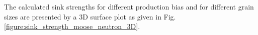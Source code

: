 \documentclass[a4paper]{article}
\begin{document}
      \newpage
      The calculated sink strengths for different production bias and for different grain sizes are presented by a 3D surface plot as given in Fig. \ref{figure:sink_strength_moose_neutron_3D}.
      \begin{figure}[h!]  %
        \centering

\end{figure}
\end{document}
